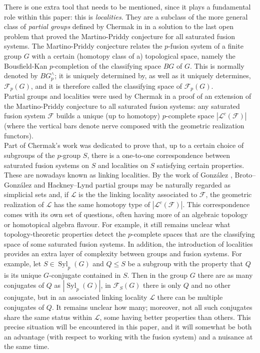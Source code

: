 \documentclass{amsart}
\numberwithin{equation}{section}
\theoremstyle{definition}
\theoremstyle{subresult}
\theoremstyle{caseresult}
\newcommand{\F}{\mathcal{F}}
\renewcommand{\L}{\mathcal{L}}
\newcommand{\Syl}{\operatorname{Syl}}
\newcommand{\<}{\langle}
\renewcommand{\>}{\rangle}
\begin{document}
There is one extra tool that needs to be mentioned, since it plays a fundamental role within this paper: this is \emph{localities}. They are a subclass of the more general class of \emph{partial groups} defined by Chermak in \cite{Chermak:2013} in a solution to the last open problem that proved the Martino-Priddy conjecture for all saturated fusion systems. The Martino-Priddy conjecture relates the $p$-fusion system of a finite group $G$ with a certain (homotopy class of a) topological space, namely the Bousfield-Kan $p$-completion of the classifying space $BG$ of $G$. This is normally denoted by $BG^\wedge_p$; it is uniquely determined by, as well as it uniquely determines, $\F_p(G)$, and it is therefore called the classifying space of $\F_p(G)$.\\
Partial groups and localities were used by Chermak in a proof of an extension of the Martino-Priddy conjecture to all saturated fusion systems: any saturated fusion system $\F$ builds a unique (up to homotopy) $p$-complete space $|\L^c(\F)|$ (where the vertical bars denote nerve composed with the geometric realization functors).\\
Part of Chermak's work was dedicated to prove that, up to a certain choice of subgroups of the $p$-group $S$, there is a one-to-one correspondence between saturated fusion systems on $S$ and localities on $S$ satisfying certain properties. These are nowadays known as linking localities. By the work of Gonz\'alez \cite{Gonzalez:2015}, Broto--Gonz\'alez \cite{Broto-Gonzalez:2021} and Hackney--Lynd \cite{Hackney-Lynd:2025} partial groups may be naturally regarded as simplicial sets and, if $\L$ is the the linking locality associated to $\F$, the geometric realization of $\L$ has the same homotopy type of $|\L^c(\F)|$. This correspondence comes with its own set of questions, often having more of an algebraic topology or homotopical algebra flavour. For example, it still remains unclear what topology-theoretic properties detect the $p$-complete spaces that are the classifying space of some saturated fusion systems. In addition, the introduction of localities provides an extra layer of complexity between groups and fusion systems. For example, let $S \in \Syl_p(G)$ and $Q \le S$ be a subgroup with the property that $Q$ is its unique $G$-conjugate contained in $S$. Then in the group $G$ there are as many conjugates of $Q$ as $|\Syl_p(G)|$, in $\F_S(G)$ there is only $Q$ and no other conjugate, but in an associated linking locality $\L$ there can be multiple conjugates of $Q$. It remains unclear how many; moreover, not all such conjugates share the same status within $\L$, some having better properties than others. This precise situation will be encountered in this paper, and it will somewhat be both an advantage (with respect to working with the fusion system) and a nuisance at the same time.\\
\end{document}
